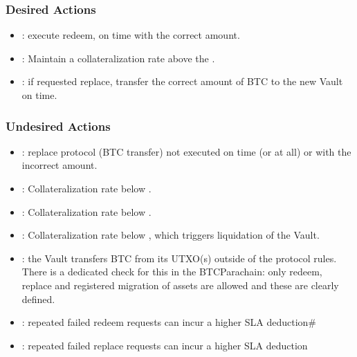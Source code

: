 \documentclass[a4paper,10pt,english]{sphinxmanual}
\begin{document}
\subsubsection{Desired Actions}
\label{\detokenize{economics/SLA:id5}}\begin{itemize}
\item {} 
: execute redeem, on time with the correct amount.

\item {} 
: Maintain a collateralization rate above the .

\item {} 
: if requested replace, transfer the correct amount of BTC to the new Vault on time.

\end{itemize}


\subsubsection{Undesired Actions}
\label{\detokenize{economics/SLA:id6}}\begin{itemize}
\item {} 
: replace protocol (BTC transfer) not executed on time (or at all) or with the incorrect amount.

\item {} 
: Collateralization rate below  .

\item {} 
:  Collateralization rate below  .

\item {} 
:   Collateralization rate below  , which triggers liquidation of the Vault.

\item {} 
: the Vault transfers BTC from its UTXO(s) outside of the protocol rules. There is a dedicated check for this in the BTC\sphinxhyphen{}Parachain: only redeem, replace and registered migration of assets are allowed and these are clearly defined.

\item {} 
: repeated failed redeem requests can incur a higher SLA deduction\#

\item {} 
: repeated failed replace requests can incur a higher SLA deduction

\end{itemize}
\end{document}

